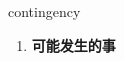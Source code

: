 
\begin{frame}
{\huge contingency}
\begin{center}
\begin{enumerate}\Large
  \item \textbf{可能发生的事}
\end{enumerate}
\end{center}
\end{frame}
